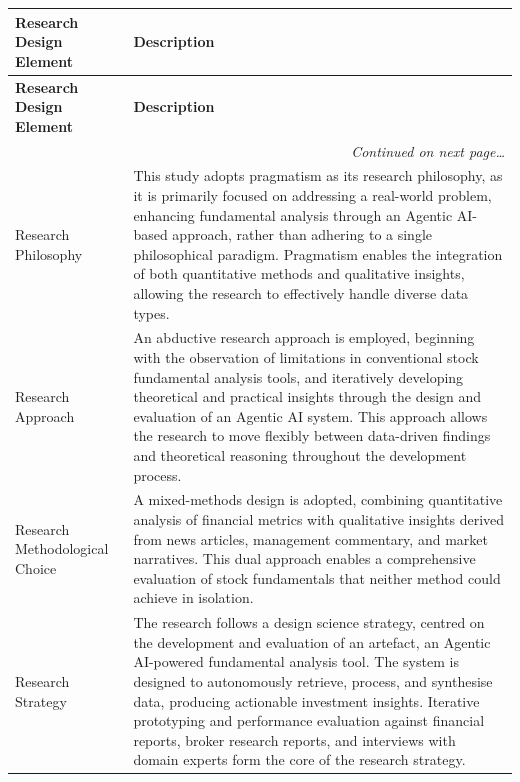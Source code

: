 \begin{longtable}{|p{4.8cm}|p{10cm}|}
    \hline
    \textbf{Research Design Element} & \textbf{Description} \\
    \hline
    \endfirsthead

    \hline
    \textbf{Research Design Element} & \textbf{Description} \\
    \hline
    \endhead

    \hline
    \multicolumn{2}{|r|}{\textit{Continued on next page\ldots}} \\
    \hline
    \endfoot

    \endlastfoot

    Research Philosophy &
    This study adopts pragmatism as its research philosophy, as it
    is primarily focused on addressing a real-world problem, enhancing
    fundamental analysis through an Agentic AI-based approach, rather
    than adhering to a single philosophical paradigm. Pragmatism enables
    the integration of both quantitative methods and qualitative insights,
    allowing the research to effectively handle diverse data types. \\
    \hline
    Research Approach &
    An abductive research approach is employed, beginning with the
    observation of limitations in conventional stock fundamental analysis
    tools, and iteratively developing theoretical and practical insights
    through the design and evaluation of an Agentic AI system. This
    approach allows the research to move flexibly between data-driven
    findings and theoretical reasoning throughout the development process. \\
    \hline
    Research Methodological Choice &
    A mixed-methods design is adopted, combining quantitative analysis
    of financial metrics with qualitative insights derived from news
    articles, management commentary, and market narratives. This dual
    approach enables a comprehensive evaluation of stock fundamentals
    that neither method could achieve in isolation. \\
    \hline
    Research Strategy &
    The research follows a design science strategy, centred on the
    development and evaluation of an artefact, an Agentic AI-powered
    fundamental analysis tool. The system is designed to autonomously
    retrieve, process, and synthesise data, producing actionable
    investment insights. Iterative prototyping and performance evaluation
    against financial reports, broker research reports, and interviews
    with domain experts form the core of the research strategy. \\

\end{longtable}
